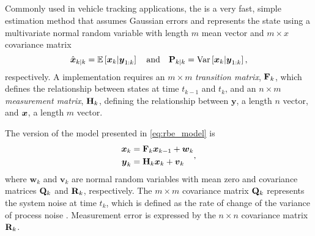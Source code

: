 \subsection{\kf{}}
\label{sec:kf}

Commonly used in vehicle tracking applications, the \kf{} is a very fast, simple estimation method \citep{Anderson_1979} that assumes Gaussian errors and represents the state using a multivariate normal random variable with length $m$ mean vector and $m\times x$ covariance matrix
\begin{equation}
\label{eq:kf_estimators}
\hat{\boldsymbol x}_{k|k} = \mathbb{E}\left[\boldsymbol x_k | \boldsymbol{y}_{1:k}\right]
\quad\text{and}\quad
\mathbf{P}_{k|k} = \mathrm{Var}\left[\boldsymbol x_k | \boldsymbol{y}_{1:k}\right],
\end{equation}
respectively. A \kf{} implementation requires an $m\times m$ \emph{transition matrix}, $\mathbf{F}_k$, which defines the relationship between states at time $t_{k-1}$ and $t_k$, and an $n\times m$ \emph{measurement matrix}, $\mathbf{H}_k$, defining the relationship between $\boldsymbol{y}$, a length $n$ vector, and $\boldsymbol x$, a length $m$ vector.


The \kf{} version of the model presented in \cref{eq:rbe_model} is
\begin{equation}
\label{eq:kf_model}
\begin{split}
\boldsymbol x_k &= \mathbf{F}_k\boldsymbol x_{k-1} + \boldsymbol{w}_k \\
\boldsymbol{y}_k &= \mathbf{H}_k\boldsymbol x_k + \boldsymbol{v}_k
\end{split},
\end{equation}
where $\boldsymbol{w}_k$ and $\boldsymbol{v}_k$ are normal random variables with mean zero and covariance matrices $\mathbf{Q}_k$ and $\mathbf{R}_k$, respectively. The $m\times m$ covariance matrix $\mathbf{Q}_k$ represents the system noise at time $t_k$, which is defined as the rate of change of the variance of process noise \citep{Cathey_2003}. Measurement error is expressed by the $n\times n$ covariance matrix $\mathbf{R}_k$.


